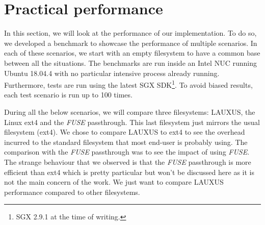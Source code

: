 \documentclass[../main.tex]{subfiles}
\begin{document}
\section{Practical performance}
\label{section:analysis:pratic_performance}
\par In this section, we will look at the performance of our implementation. To do so, we developed a benchmark to showcase the performance of multiple scenarios. In each of these scenarios, we start with an empty filesystem to have a common base between all the situations. The benchmarks are run inside an Intel NUC running Ubuntu 18.04.4 with no particular intensive process already running. Furthermore, tests are run using the latest SGX SDK\footnote{SGX 2.9.1 at the time of writing.}. To avoid biased results, each test scenario is run up to 100 times.
\par During all the below scenarios, we will compare three filesystems: LAUXUS, the Linux ext4 and the \textit{FUSE} passthrough. This last filesystem just mirrors the usual filesystem (ext4). We chose to compare LAUXUS to ext4 to see the overhead incurred to the standard filesystem that most end-user is probably using. The comparison with the \textit{FUSE} passthrough was to see the impact of using \textit{FUSE}. The strange behaviour that we observed is that the \textit{FUSE} passthrough is more efficient than ext4 which is pretty particular but won't be discussed here as it is not the main concern of the work. We just want to compare LAUXUS performance compared to other filesystems.
\end{document}
